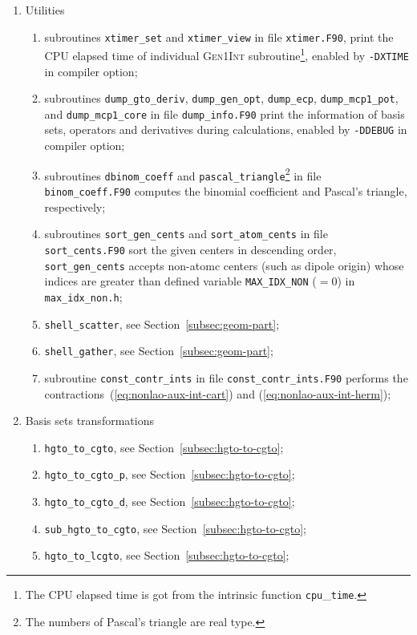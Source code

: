 \documentclass[a4paper,11pt,twoside,openright]{book}
\begin{document}
\begin{enumerate}
  \item Utilities
  \begin{enumerate}
    \item subroutines \verb|xtimer_set| and \verb|xtimer_view| in file \verb|xtimer.F90|, print the CPU
      elapsed time of individual \textsc{Gen1Int} subroutine\footnote{The CPU elapsed time is got from
      the intrinsic function \texttt{cpu}\_\texttt{time}.}, enabled by \verb|-DXTIME| in compiler option;
    \item subroutines \verb|dump_gto_deriv|, \verb|dump_gen_opt|, \verb|dump_ecp|, \verb|dump_mcp1_pot|,
      and \verb|dump_mcp1_core| in file \verb|dump_info.F90| print the information of basis sets,
      operators and derivatives during calculations, enabled by \verb|-DDEBUG| in compiler option;
    \item subroutines \verb|dbinom_coeff| and \verb|pascal_triangle|\footnote{The numbers of Pascal's triangle
      are real type.} in file \verb|binom_coeff.F90| computes the binomial coefficient and Pascal's triangle, respectively;
    \item subroutines \verb|sort_gen_cents| and \verb|sort_atom_cents| in file \verb|sort_cents.F90|
      sort the given centers in descending order, \verb|sort_gen_cents| accepts non-atomc centers (such as dipole origin)
      whose indices are greater than defined variable \verb|MAX_IDX_NON| ($=0$) in \verb|max_idx_non.h|;
    \item \verb|shell_scatter|, see Section~\ref{subsec:geom-part};
    \item \verb|shell_gather|, see Section~\ref{subsec:geom-part};
    \item subroutine \verb|const_contr_ints| in file \verb|const_contr_ints.F90| performs the contractions~(\ref{eq:nonlao-aux-int-cart})
      and (\ref{eq:nonlao-aux-int-herm});
  \end{enumerate}
%
  \item Basis sets transformations
  \begin{enumerate}
    \item \verb|hgto_to_cgto|, see Section~\ref{subsec:hgto-to-cgto};
    \item \verb|hgto_to_cgto_p|, see Section~\ref{subsec:hgto-to-cgto};
    \item \verb|hgto_to_cgto_d|, see Section~\ref{subsec:hgto-to-cgto};
    \item \verb|sub_hgto_to_cgto|, see Section~\ref{subsec:hgto-to-cgto};
    \item \verb|hgto_to_lcgto|, see Section~\ref{subsec:hgto-to-cgto};

\end{enumerate}
\end{enumerate}
\end{document}
